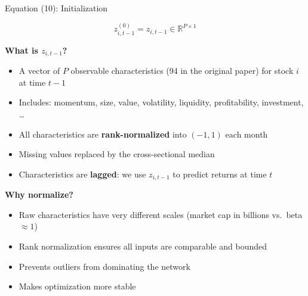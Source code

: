 \documentclass[aspectratio=169]{beamer}
\newcommand{\R}{\mathbb{R}}
\begin{document}
\begin{frame}{Equation (10): Initialization}

\[
z^{(0)}_{i,t-1} = z_{i,t-1} \in \R^{P \times 1}
\]

\vspace{0.5em}
\textbf{What is $z_{i,t-1}$?}
\begin{itemize}
    \item A vector of $P$ observable characteristics (94 in the original paper) for stock $i$ at time $t-1$
    \item Includes: momentum, size, value, volatility, liquidity, profitability, investment, \ldots
    \item All characteristics are \textbf{rank-normalized} into $(-1, 1)$ each month
    \item Missing values replaced by the cross-sectional median
    \item Characteristics are \textbf{lagged}: we use $z_{i,t-1}$ to predict returns at time $t$
\end{itemize}

\vspace{0.5em}
\textbf{Why normalize?}
\begin{itemize}
    \item Raw characteristics have very different scales (market cap in billions vs.\ beta $\approx 1$)
    \item Rank normalization ensures all inputs are comparable and bounded
    \item Prevents outliers from dominating the network
    \item Makes optimization more stable
\end{itemize}
\end{frame}
%
%
\end{document}
